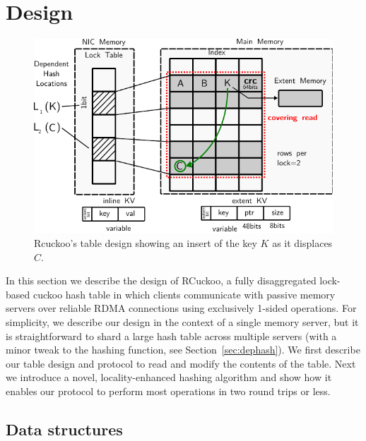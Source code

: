 \section{Design}
\label{sec:design}

\begin{figure}[t]
    \includegraphics[width=0.99\linewidth]{fig/table-diagram.pdf}
    \caption{Rcuckoo's table design showing an insert of the key $K$ as it displaces $C$.}
    \label{fig:table-diagram}
\end{figure}

In this section we describe the design of RCuckoo, a fully
disaggregated lock-based cuckoo hash table in which clients
communicate with passive memory servers over reliable RDMA connections
using exclusively 1-sided operations.  For simplicity, we describe our
design in the context of a single memory server, but it is
straightforward to shard a large hash table across multiple servers
(with a minor tweak to the hashing function, see
Section~\ref{sec:dephash}).  We first describe our table design and
protocol to read and modify the contents of the table.  Next we
introduce a novel, locality-enhanced hashing algorithm and show how it
enables our protocol to perform most operations in two round trips or
less.

\subsection{Data structures}
\label{sec:table-design}


